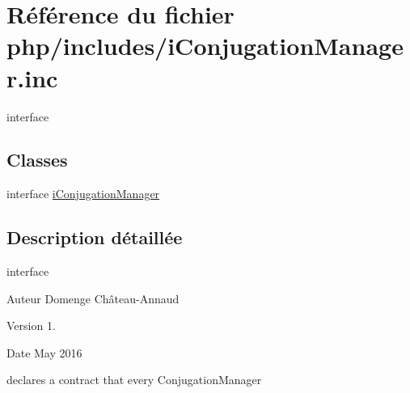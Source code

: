 \hypertarget{iConjugationManager_8inc}{}\section{Référence du fichier php/includes/i\+Conjugation\+Manager.inc}
\label{iConjugationManager_8inc}


interface  


\subsection*{Classes}
\begin{DoxyCompactItemize}
\item 
interface \hyperlink{interfaceiConjugationManager}{i\+Conjugation\+Manager}
\end{DoxyCompactItemize}


\subsection{Description détaillée}
interface 

\begin{DoxyAuthor}{Auteur}
Domenge Château-\/\+Annaud 
\end{DoxyAuthor}
\begin{DoxyVersion}{Version}
1. 
\end{DoxyVersion}
\begin{DoxyDate}{Date}
May 2016
\end{DoxyDate}
declares a contract that every Conjugation\+Manager 